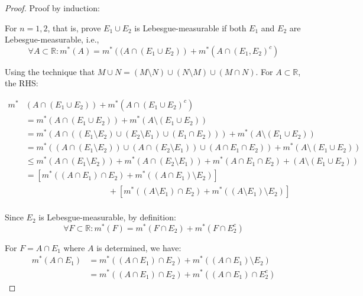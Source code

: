 \documentclass[reqno]{amsart}
\theoremstyle{definition}
\begin{document}
\begin{proof}
Proof by induction:

For $n = 1, 2$, that is, prove $E_{1} \cup E_{2}$ is Lebesgue-measurable if both $E_{1}$ and $E_{2}$ are Lebesgue-measurable, i.e.,
$$
\forall A \subset \mathbb{R}: m^{*}(A) = m^{*}\left((A \cap (E_{1} \cup E_{2})\right) + m^{*}\left( A \cap (E_{1}, E_{2})^{c} \right)
$$

Using the technique that $M \cup N = (M \setminus N) \cup (N \setminus M) \cup (M \cap N)$. For $A \subset \mathbb{R}$, the RHS:

\begin{align*}
m^{*} & \left(A \cap (E_{1} \cup E_{2})\right) + m^{*}\left( A \cap (E_{1} \cup E_{2})^{c} \right)\\
& = m^{*}\left(A \cap (E_{1} \cup E_{2})\right) + m^{*}\left( A \setminus (E_{1} \cup E_{2}) \right)\\
& = m^{*} \left(A \cap \left((E_{1} \setminus E_{2}) \cup (E_{2} \setminus E_{1}) \cup (E_{1} \cap E_{2})\right)\right) + m^{*}\left( A \setminus (E_{1} \cup E_{2}) \right)\\
& = m^{*} \left((A \cap (E_{1} \setminus E_{2})) \cup (A \cap (E_{2} \setminus E_{1})) \cup (A \cap E_{1} \cap E_{2})\right) + m^{*}\left( A \setminus (E_{1} \cup E_{2}) \right)\\
& \leq m^{*} \left(A \cap (E_{1} \setminus E_{2})\right) + m^{*}\left(A \cap (E_{2} \setminus E_{1})\right) + m^{*}\left(A \cap E_{1} \cap E_{2}\right) + \left( A \setminus (E_{1} \cup E_{2}) \right)\\
& = \left[ m^{*}\left((A \cap E_{1}) \cap E_{2}\right) + m^{*}\left((A \cap E_{1}) \setminus E_{2} \right)\right]\\
& \qquad \qquad \qquad \qquad \qquad + \left[ m^{*}\left((A \setminus E_{1}) \cap E_{2}\right) + m^{*}\left((A \setminus E_{1}) \setminus E_{2} \right)\right]
\end{align*}
~\\

Since $E_{2}$ is Lebesgue-measurable, by definition: 
$$
\forall F \subset \mathbb{R}: m^{*}(F) = m^{*}(F \cap E_{2}) + m^{*}(F \cap E^{c}_{2})
$$

For $F = A \cap E_{1}$ where $A$ is determined, we have:
\begin{align*}
m^{*}(A \cap E_{1}) & = m^{*}\left((A \cap E_{1}) \cap E_{2}\right) + m^{*}\left((A \cap E_{1}) \setminus E_{2}\right)\\
& = m^{*}\left((A \cap E_{1}) \cap E_{2}\right) + m^{*}\left((A \cap E_{1}) \cap E^{c}_{2}\right)
\end{align*}


\end{proof}
\end{document}
